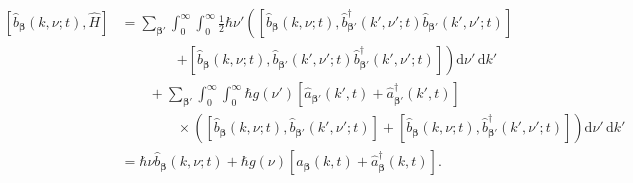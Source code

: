 \documentclass{article}
\begin{document}
\begin{equation}
\begin{split}
\left[\hat{b}_{\bm{\beta}}(k,\nu;t),\hat{H}\right] &= \sum_{\bm{\beta}'}\int_0^\infty\int_0^\infty\frac{1}{2}\hbar\nu'\left(\left[\hat{b}_{\bm{\beta}}(k,\nu;t),\hat{b}_{\bm{\beta}'}^\dagger(k',\nu';t)\hat{b}_{\bm{\beta}'}(k',\nu';t)\right]\right.\\
&\qquad\qquad\left. + \left[\hat{b}_{\bm{\beta}}(k,\nu;t),\hat{b}_{\bm{\beta}'}(k',\nu';t)\hat{b}_{\bm{\beta}'}^\dagger(k',\nu';t)\right]\right)\mathrm{d}\nu'\,\mathrm{d}k'\\
&\qquad + \sum_{\bm{\beta}'}\int_0^\infty\int_0^\infty \hbar g(\nu')\left[\hat{a}_{\bm{\beta}'}(k',t) + \hat{a}_{\bm{\beta}'}^\dagger(k',t)\right]\\
&\qquad\qquad\times\left(\left[\hat{b}_{\bm{\beta}}(k,\nu;t),\hat{b}_{\bm{\beta}'}(k',\nu';t)\right] + \left[\hat{b}_{\bm{\beta}}(k,\nu;t),\hat{b}_{\bm{\beta}'}^\dagger(k',\nu';t)\right]\right)\mathrm{d}\nu'\,\mathrm{d}k'\\[1.0em]
&= \hbar\nu\hat{b}_{\bm{\beta}}(k,\nu;t) + \hbar g(\nu)\left[\hat{a}_{\bm{\beta}}(k,t) + \hat{a}_{\bm{\beta}}^\dagger(k,t)\right].
\end{split}
\end{equation}
\end{document}
